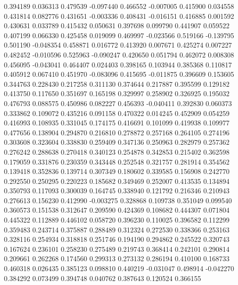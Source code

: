 0.394189
0.036313
0.479539
-0.097440
0.466552
-0.007005
0.415900
0.034558
0.431814
0.082776
0.431651
-0.003336
0.408431
-0.016151
0.416885
0.001592
0.430631
0.033789
0.415432
0.050631
0.397698
0.099790
0.441907
0.059522
0.407199
0.066330
0.425458
0.019099
0.469997
-0.023566
0.519166
-0.139795
0.501190
-0.048354
0.458871
0.016772
0.413920
0.007671
0.425274
0.007227
0.482452
-0.010596
0.525963
-0.090247
0.420650
0.051794
0.462072
0.008308
0.456095
-0.043041
0.464407
0.024403
0.398165
0.103944
0.385368
0.110817
0.405912
0.067410
0.451970
-0.083096
0.415695
-0.011875
0.396609
0.153605
0.344763
0.228430
0.217258
0.311130
0.374644
0.217887
0.395599
0.129182
0.413750
0.117650
0.351697
0.165198
0.329997
0.258902
0.326925
0.195032
0.476793
0.088575
0.450986
0.082227
0.456393
-0.040411
0.392830
0.060373
0.333862
0.109072
0.435216
0.091158
0.470322
0.014245
0.452909
0.054259
0.416993
0.108935
0.331045
0.174175
0.416691
0.101099
0.419938
0.109977
0.477656
0.138904
0.294870
0.216810
0.278872
0.257168
0.264105
0.274196
0.303608
0.323604
0.338830
0.259409
0.347136
0.250963
0.282979
0.257362
0.276242
0.288638
0.270418
0.340123
0.254878
0.342853
0.215402
0.362598
0.179059
0.331876
0.230359
0.343448
0.252548
0.321757
0.281914
0.354562
0.139418
0.352836
0.139714
0.307349
0.180602
0.339585
0.156908
0.242770
0.292550
0.250295
0.220223
0.185682
0.349469
0.252007
0.413535
0.134894
0.350793
0.117093
0.300039
0.164745
0.338940
0.121792
0.216346
0.210943
0.276613
0.156230
0.412990
-0.003275
0.328868
0.109738
0.351049
0.099540
0.360573
0.151538
0.312647
0.209590
0.424369
0.108682
0.444307
0.071804
0.445322
0.112889
0.446102
0.058720
0.396230
0.110025
0.396582
0.112299
0.359483
0.243714
0.375887
0.288489
0.312324
0.272530
0.338366
0.253163
0.328116
0.254934
0.318818
0.251746
0.194190
0.294862
0.245522
0.320743
0.167624
0.236101
0.258230
0.275489
0.219743
0.368414
0.242101
0.290814
0.209661
0.262268
0.174560
0.299313
0.273132
0.286194
0.410100
0.168733
0.460318
0.026435
0.385123
0.098810
0.440219
-0.031047
0.498914
-0.042270
0.384292
0.073499
0.394748
0.040762
0.387643
0.120524
0.366155

